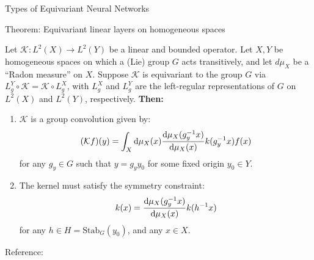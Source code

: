 \documentclass[9pt,dvipsnames]{beamer}
\begin{document}
\begin{frame}{Types of Equivariant Neural Networks}

	\begin{block}{Theorem: Equivariant linear layers on homogeneous spaces}

		Let $\mathcal{K} : L^2(X) \rightarrow L^2(Y)$ be a linear and bounded operator. Let $X, Y$ be homogeneous spaces on which a (Lie) group $G$ acts transitively, and let $d\mu_X$ be a ``Radon measure'' on $X$. Suppose $\mathcal{K}$ is equivariant to the group $G$ via $L^Y_g \circ \mathcal{K} = \mathcal{K} \circ L^X_g$, with $L^X_g$ and $L^Y_g$ are the left-regular representations of $G$ on $L^2(X)$ and $L^2(Y)$, respectively. \textbf{Then:}

		\begin{enumerate}
			\item $\mathcal{K}$ is a group convolution given by:
			      \begin{equation*}
				      (\mathcal{K}f)(y) = \int_X \dd\mu_X(x) \dv{\mu_X(g_y^{-1} x)}{\mu_X(x)} k(g_y^{-1} x) f(x)
			      \end{equation*}
			      for any $g_y \in G$ such that $y = g_y y_0$ for some fixed origin $y_0 \in Y$.

			\item The kernel must satisfy the symmetry constraint:
			      \begin{equation*}
				      k(x) = \dv{\mu_X(g_y^{-1} x)}{\mu_X(x)} k(h^{-1} x)
			      \end{equation*}
			      for any $h \in H = \mathrm{Stab}_G(y_0)$, and any $x \in X$.
		\end{enumerate}
	\end{block}

	Reference: \cite{bekkers_introduction_2021}

\end{frame}
\end{document}

